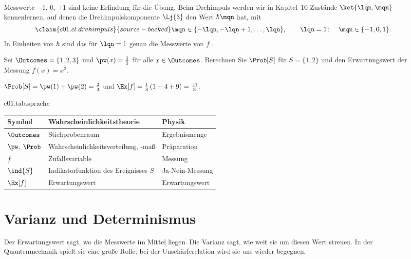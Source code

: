 Messwerte $-1$, $0$, $+1$ sind keine Erfindung für die Übung. Beim Drehimpuls werden wir
in Kapitel~10 Zustände $\ket{\lqn, \mqn}$ kennenlernen, auf denen die
Drehimpulskomponente $\Lj{3}$ den Wert $\hbar \mqn$ hat, mit
\begin{equation}\label{c01.eq.drehimpuls}\claim{c01.cl.drehimpuls}{source-backed}
  \mqn \in \{-\lqn, -\lqn + 1, \dots, \lqn\},
  \qquad
  \lqn = 1\colon \quad \mqn \in \{-1, 0, 1\} .
\end{equation}
In Einheiten von $\hbar$ sind das für $\lqn = 1$ genau die Messwerte von $f$
.

\begin{exercise}\label{c01.exc.drei}
  Sei $\Outcomes = \{1, 2, 3\}$ und $\pw(x) = \tfrac13$ für alle $x \in \Outcomes$.
  Berechnen Sie $\Prob[S]$ für $S = \{1, 2\}$ und den Erwartungswert der Messung
  $f(x) = x^2$.
\end{exercise}
\begin{solution}
  $\Prob[S] = \pw(1) + \pw(2) = \tfrac23$ und
  $\Ex[f] = \tfrac13\,(1 + 4 + 9) = \tfrac{14}{3}$.
\end{solution}

\begin{tpctable}{c01.tab.sprache}
  \caption{Dieselben Dinge in zwei Sprachen. Links die Wörter der
    Wahrscheinlichkeitstheorie, rechts die der Physik, die dieser Kurs benutzt.}
  \begin{tabular}{lll}
    \toprule
    Symbol & Wahrscheinlichkeitstheorie & Physik \\
    \midrule
    $\Outcomes$ & Stichprobenraum & Ergebnismenge \\
    $\pw$, $\Prob$ & Wahrscheinlichkeitsverteilung, -maß & Präparation \\
    $f$ & Zufallsvariable & Messung \\
    $\ind{S}$ & Indikatorfunktion des Ereignisses $S$ & Ja-Nein-Messung \\
    $\Ex[f]$ & Erwartungswert & Erwartungswert \\
    \bottomrule
  \end{tabular}
\end{tpctable}

\section{Varianz und Determinismus}\label{c01.s3}

Der Erwartungswert sagt, wo die Messwerte im Mittel liegen. Die Varianz sagt, wie weit sie
um diesen Wert streuen. In der Quantenmechanik spielt sie eine große Rolle; bei der
Unschärferelation wird sie uns wieder begegnen.


